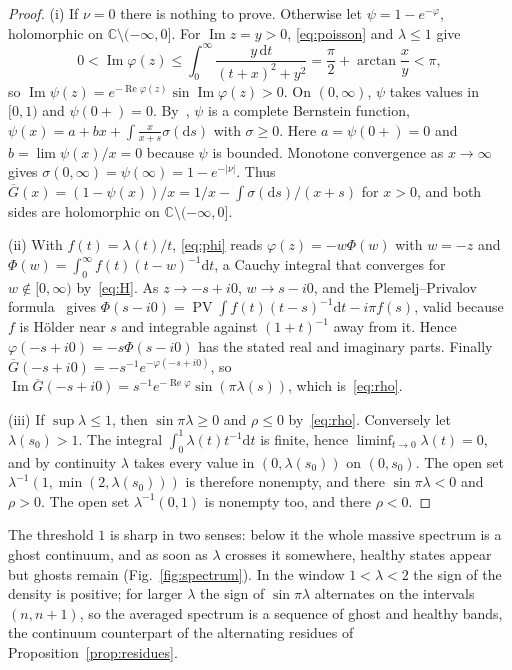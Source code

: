\documentclass[aps,prd,twocolumn,superscriptaddress,nofootinbib,longbibliography,floatfix,amsmath,amssymb,10pt]{revtex4-2}
\theoremstyle{definition}
\theoremstyle{remark}
\newcommand{\C}{\mathbb{C}}
\newcommand{\Gbar}{\overline{G}}
\newcommand{\dd}{\mathrm{d}}
\newcommand{\cut}{\C\setminus(-\infty,0]}
\DeclareMathOperator{\re}{Re}
\DeclareMathOperator{\im}{Im}
\DeclareMathOperator{\PV}{PV}
\begin{document}
\begin{proof}
(i) If $\nu=0$ there is nothing to prove. Otherwise let $\psi=1-e^{-\varphi}$,
holomorphic on $\cut$. For $\im z=y>0$, \eqref{eq:poisson} and $\lambda\le1$
give
\[
0<\im\varphi(z)\le\int_0^\infty\frac{y\,\dd t}{(t+x)^2+y^2}
=\frac\pi2+\arctan\frac xy<\pi,
\]
so $\im\psi(z)=e^{-\re\varphi(z)}\sin\im\varphi(z)>0$. On $(0,\infty)$,
$\psi$ takes values in $[0,1)$ and $\psi(0+)=0$. By~\cite[Thms.~6.2 and
6.9]{SSV2012}, $\psi$ is a complete Bernstein function,
$\psi(x)=a+bx+\int\frac{x}{x+s}\sigma(\dd s)$ with $\sigma\ge0$. Here
$a=\psi(0+)=0$ and $b=\lim\psi(x)/x=0$ because $\psi$ is bounded. Monotone
convergence as $x\to\infty$ gives $\sigma(0,\infty)=\psi(\infty)=
1-e^{-|\nu|}$. Thus $\Gbar(x)=(1-\psi(x))/x=1/x-\int\sigma(\dd s)/(x+s)$
for $x>0$, and both sides are holomorphic on $\cut$.

(ii) With $f(t)=\lambda(t)/t$, \eqref{eq:phi} reads $\varphi(z)=-w\Phi(w)$
with $w=-z$ and $\Phi(w)=\int_0^\infty f(t)(t-w)^{-1}\dd t$, a Cauchy
integral that converges for $w\notin[0,\infty)$ by~\eqref{eq:H}. As
$z\to-s+i0$, $w\to s-i0$, and the Plemelj--Privalov
formula~\cite[\S\S16--17]{Muskhelishvili1953} gives
$\Phi(s-i0)=\PV\int f(t)(t-s)^{-1}\dd t-i\pi f(s)$, valid because $f$ is
H\"older near $s$ and integrable against $(1+t)^{-1}$ away from it. Hence
$\varphi(-s+i0)=-s\Phi(s-i0)$ has the stated real and imaginary parts.
Finally $\Gbar(-s+i0)=-s^{-1}e^{-\varphi(-s+i0)}$, so
$\im\Gbar(-s+i0)=s^{-1}e^{-\re\varphi}\sin(\pi\lambda(s))$, which
is~\eqref{eq:rho}.

(iii) If $\sup\lambda\le1$, then $\sin\pi\lambda\ge0$ and $\rho\le0$
by~\eqref{eq:rho}. Conversely let $\lambda(s_0)>1$. The integral
$\int_0^1\lambda(t)t^{-1}\dd t$ is finite, hence $\liminf_{t\to0}\lambda(t)=0$, and by
continuity $\lambda$ takes every value in $(0,\lambda(s_0))$ on $(0,s_0)$.
The open set $\lambda^{-1}(1,\min(2,\lambda(s_0)))$ is therefore nonempty, and
there $\sin\pi\lambda<0$ and $\rho>0$. The open set $\lambda^{-1}(0,1)$ is
nonempty too, and there $\rho<0$.
\end{proof}

The threshold $1$ is sharp in two senses: below it the whole massive spectrum
is a ghost continuum, and as soon as $\lambda$ crosses it somewhere, healthy
states appear but ghosts remain (Fig.~\ref{fig:spectrum}). In the window
$1<\lambda<2$ the sign of the density is positive; for larger $\lambda$ the
sign of $\sin\pi\lambda$ alternates on the intervals $(n,n+1)$, so the
averaged spectrum is a sequence of ghost and healthy bands, the continuum
counterpart of the alternating residues of Proposition~\ref{prop:residues}.
\end{document}
